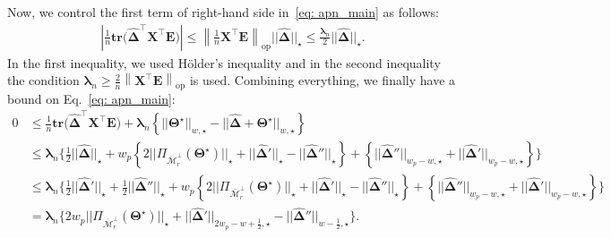 \documentclass[alpha-refs]{wiley-article}
\begin{document}
Now, we control the first term of right-hand side in~\eqref{eq: apn_main} as follows:
\begin{align}
    \left| \frac{1}{n} \textbf{tr}\big( \boldsymbol{\widehat{\Delta}}^{\top} \boldsymbol{X}^{\top}\boldsymbol{E} \big) \right|
    \leq \left\|\frac{1}{n} \boldsymbol{X}^{\top}\boldsymbol{E} \right\|_{\text{op}} ||\boldsymbol{\widehat{\Delta}}||_{\star}
    \leq \frac{\boldsymbol{\lambda}_{n}}{2} ||\boldsymbol{\widehat{\Delta}}||_{\star}.
    \label{holder_ineq}
\end{align}
In the first inequality, we used H\"older's inequality and in the second inequality
the condition $\boldsymbol{\lambda}_{n}\geq\frac{2}{n}\left\|\boldsymbol{X}^{\top}\boldsymbol{E} \right\|_{\text{op}}$ is used.
Combining everything, we finally have a bound on Eq.~\eqref{eq: apn_main}:
\begin{align}
    0  & \leq \frac{1}{n} \textbf{tr}\big( \boldsymbol{\widehat{\Delta}}^{\top} \boldsymbol{X}^{\top}\boldsymbol{E} \big)
    + \boldsymbol{\lambda}_{n}\left\lbrace||\boldsymbol{\Theta^{\star}}||_{w, \star} - ||\boldsymbol{\widehat{\Delta}} + \boldsymbol{\Theta^{\star}}||_{w, \star}\right\rbrace \nonumber\\
    & \leq \boldsymbol{\lambda}_{n} \Bigg\{ \frac{1}{2}||\boldsymbol{\widehat{\Delta}}||_{\star} + w_{p}\left\lbrace 2||\Pi_{\overline{\mathcal{M}}_{r}^{\perp}}(\boldsymbol{\Theta^{\star}})||_{\star} + ||\boldsymbol{\widehat{\Delta}}'||_{\star} - ||\boldsymbol{\widehat{\Delta}}''||_{\star}  \right\rbrace + \left\lbrace ||\boldsymbol{\widehat{\Delta}}''||_{w_{p} - w, \star}  + ||\boldsymbol{\widehat{\Delta}}'||_{w_{p} - w, \star}\right\rbrace \Bigg\} \nonumber\\
    & \leq \boldsymbol{\lambda}_{n} \Bigg\{ \frac{1}{2}||\boldsymbol{\widehat{\Delta}}'||_{\star} + \frac{1}{2}||\boldsymbol{\widehat{\Delta}}''||_{\star} + w_{p}\left\lbrace 2||\Pi_{\overline{\mathcal{M}}_{r}^{\perp}}(\boldsymbol{\Theta^{\star}})||_{\star} + ||\boldsymbol{\widehat{\Delta}}'||_{\star} - ||\boldsymbol{\widehat{\Delta}}''||_{\star}  \right\rbrace
    + \left\lbrace ||\boldsymbol{\widehat{\Delta}}''||_{w_{p} - w, \star}  + ||\boldsymbol{\widehat{\Delta}}'||_{w_{p} - w, \star}\right\rbrace \Bigg\} \nonumber\\
    &= \boldsymbol{\lambda}_{n} \Bigg\{ 2w_{p}||\Pi_{\overline{\mathcal{M}}_{r}^{\perp}}(\boldsymbol{\Theta^{\star}})||_{\star} +  ||\boldsymbol{\widehat{\Delta}}'||_{2w_{p}-w+\frac{1}{2}, \star} - ||\boldsymbol{\widehat{\Delta}}''||_{w - \frac{1}{2},\star} \Bigg\}. \label{eq: pre_new_main}
\end{align}
\end{document}
